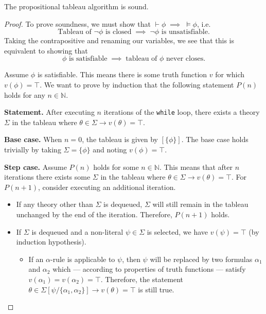 \begin{theorem}
    The propositional tableau algorithm is sound. 
\end{theorem}
\begin{proof}
    To prove soundness, we must show that \(\vdash\phi \;\implies\; \models\phi\), i.e.
    \[\text{Tableau of } \neg\phi \text{ is closed} \;\implies\; \neg\phi \text{ is unsatisfiable.}\]
    Taking the contrapositive and renaming our variables, we see that this is equivalent to showing that
    \[\phi \text{ is satisfiable} \;\implies\; \text{tableau of } \phi \text{ never closes.}\]

    Assume \(\phi\) is satisfiable. This means there is some truth function \(v\) for which \(v(\phi) = \top\). We want to prove by induction that the following statement \(P(n)\) holds for any \(n \in \mathbb{N}\).

    \textbf{Statement.} After executing \(n\) iterations of the \texttt{while} loop, there exists a theory \(\Sigma\) in the tableau where \(\theta \in \Sigma \rightarrow v(\theta) = \top\).

    \textbf{Base case.} When \(n = 0\), the tableau is given by \([\{\phi\}]\). The base case holds trivially by taking \(\Sigma = \{\phi\}\) and noting \(v(\phi) = \top\).

    \textbf{Step case.} Assume \(P(n)\) holds for some \(n \in \mathbb{N}\). This means that after \(n\) iterations there exists some \(\Sigma\) in the tableau where \(\theta \in \Sigma \rightarrow v(\theta) = \top\). For \(P(n+1)\), consider executing an additional iteration.
    \begin{itemize}
        \item If any theory other than \(\Sigma\) is dequeued, \(\Sigma\) will still remain in the tableau unchanged by the end of the iteration. Therefore, \(P(n + 1)\) holds.
        \item If \(\Sigma\) is dequeued and a non-literal \(\psi \in \Sigma\) is selected, we have \(v(\psi) = \top\) (by induction hypothesis).
        
        \begin{itemize}
            \item If an \(\alpha\)-rule is applicable to \(\psi\), then \(\psi\) will be replaced by two formulas \(\alpha_1\) and \(\alpha_2\) which --- according to properties of truth functions --- satisfy \(v(\alpha_1) = v(\alpha_2) = \top\). Therefore, the statement \(\theta \in \Sigma[\psi/\{\alpha_1, \alpha_2\}] \rightarrow v(\theta) = \top\) is still true.
            

\end{itemize}
\end{itemize}
\end{proof}
